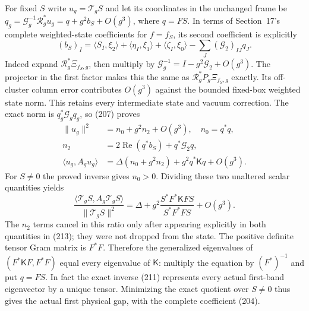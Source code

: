 \documentclass[11pt]{article}
\begin{document}
For fixed $S$ write $u_g=\mathcal T_gS$ and let its coordinates in
the unchanged frame be
$q_g=\mathcal G_g^{-1}\mathcal R_g^*u_g=q+g^2b_S+O(g^3)$,
where $q=FS$. In terms of Section~17's complete weighted-state
coefficients for $f=f_S$, its second coefficient is explicitly
\[
 (b_S)_I=\langle S_I,\xi_2\rangle+\langle\eta_I,\xi_1\rangle
       +\langle\zeta_I,\xi_0\rangle
       -\sum_J(\mathcal G_2)_{IJ}q_J.
\]
Indeed expand $\mathcal R_g^*\Xi_{f_S,g}$, then multiply by
$\mathcal G_g^{-1}=I-g^2\mathcal G_2+O(g^3)$.
The projector in the first factor makes this the same as
$\mathcal R_g^*P_g\Xi_{f_S,g}$ exactly. Its off-cluster column
error contributes $O(g^3)$ against the bounded fixed-box weighted
state norm. This retains every intermediate state and vacuum correction.
The exact norm is $q_g^*\mathcal G_gq_g$, so (207)
proves
\begin{align}
 \|u_g\|^2&=n_0+g^2n_2+O(g^3),\quad n_0=q^*q,\nonumber\\
 n_2&=2\operatorname{Re}(q^*b_S)+q^*\mathcal G_2q,\nonumber\\
 \langle u_g,A_gu_g\rangle
       &=\Delta(n_0+g^2n_2)+g^2q^*\mathsf Kq+O(g^3).
 \label{eq:band-raw-expansions}
\end{align}
For $S\ne0$ the proved inverse gives $n_0>0$. Dividing these two
unaltered scalar quantities yields
\begin{equation}\label{eq:band-tensor-Rayleigh}
 \frac{\langle\mathcal T_gS,A_g\mathcal T_gS\rangle}
      {\|\mathcal T_gS\|^2}
 =\Delta+g^2\frac{S^*F^*\mathsf KFS}{S^*F^*FS}+O(g^3).
\end{equation}
The $n_2$ terms cancel in this ratio only after appearing explicitly
in both quantities in (213); they were not
dropped from the state. The positive definite tensor Gram matrix is
$F^*F$. Therefore the generalized eigenvalues of
$(F^*\mathsf KF,F^*F)$ equal every eigenvalue of $\mathsf K$:
multiply the equation by $(F^*)^{-1}$ and put $q=FS$.
In fact the exact inverse (211) represents
every actual first-band eigenvector by a unique tensor. Minimizing
the exact quotient over $S\ne0$ thus gives the actual first physical
gap, with the complete coefficient (204).
\end{document}
